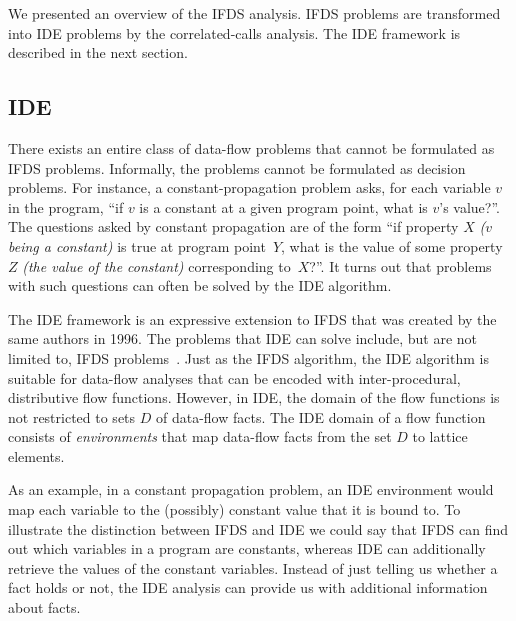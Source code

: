 
We presented an overview of the IFDS analysis. IFDS problems are transformed into IDE problems by the correlated-calls analysis. The IDE framework is described in the next section.

\subsection{IDE}\label{sec:bgide}
There exists an entire class of data-flow problems that cannot be formulated as IFDS problems. Informally, the problems cannot be formulated as decision problems. For instance, a constant-propagation problem asks, for each variable $v$ in the program, ``if $v$ is a constant at a given program point, what is $v$'s value?''.
The questions asked by constant propagation are of the form ``if property $X$ \textit{($v$ being a constant)} is true at program point~$Y$, what is the value of some property~$Z$ \textit{(the value of the constant)} corresponding to~$X$?''. It turns out that problems with such questions can often be solved by the IDE algorithm.

The IDE framework is an expressive extension to IFDS that was created by the same authors in 1996.
The problems that IDE can solve include, but are not limited to, IFDS problems~\cite{reps1995precise}. Just as the IFDS algorithm, the IDE algorithm is suitable for data-flow analyses that can be encoded with inter-procedural, distributive flow functions. However, in IDE, the domain of the flow functions is not restricted to sets $D$ of data-flow facts. The IDE domain of a flow function consists of \textit{environments} that map data-flow facts from the set $D$ to lattice elements.

As an example, in a constant propagation problem, an IDE environment would map each variable to the (possibly) constant value that it is bound to. To illustrate the distinction between IFDS and IDE we could say that IFDS can find out which variables in a program are constants, whereas IDE can additionally retrieve the values of the constant variables.
Instead of just telling us whether a fact holds or not, the IDE analysis can provide us with additional information about facts. 

